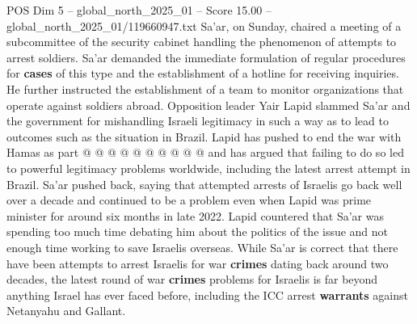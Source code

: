 \begin{textsample}{POS Dim 5 – global\_north\_2025\_01 – Score 15.00 – global\_north\_2025\_01/119660947.txt}
Sa'ar, on Sunday, chaired a meeting of a subcommittee of the security cabinet handling the phenomenon of attempts to arrest soldiers.
Sa'ar demanded the immediate formulation of regular procedures for \textbf{cases} of this type and the establishment of a hotline for receiving inquiries.
He further instructed the establishment of a team to monitor organizations that operate against soldiers abroad.
Opposition leader Yair Lapid slammed Sa'ar and the government for mishandling Israeli legitimacy in such a way as to lead to outcomes such as the situation in Brazil.
Lapid has pushed to end the war with Hamas as part @ @ @ @ @ @ @ @ @ @ and has argued that failing to do so led to powerful legitimacy problems worldwide, including the latest arrest attempt in Brazil.
Sa'ar pushed back, saying that attempted arrests of Israelis go back well over a decade and continued to be a problem even when Lapid was prime minister for around six months in late 2022.
Lapid countered that Sa'ar was spending too much time debating him about the politics of the issue and not enough time working to save Israelis overseas.
While Sa'ar is correct that there have been attempts to arrest Israelis for war \textbf{crimes} dating back around two decades, the latest round of war \textbf{crimes} problems for Israelis is far beyond anything Israel has ever faced before, including the ICC arrest \textbf{warrants} against Netanyahu and Gallant.

\end{textsample}
